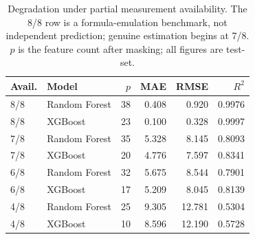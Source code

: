 \begin{table}[!t]
    \centering
    \caption{Degradation under partial measurement availability. The 8/8 row is a formula-emulation benchmark, not independent prediction; genuine estimation begins at 7/8. $p$ is the feature count after masking; all figures are test-set.}
    \label{tab:partial}
    \small
    \setlength{\tabcolsep}{4pt}
    \begin{tabular}{llrrrr}
        \toprule
        Avail. & Model & $p$ & MAE & RMSE & $R^2$ \\
        \midrule
        8/8 & Random Forest & 38 & 0.408 & 0.920 & 0.9976 \\
        8/8 & XGBoost & 23 & 0.100 & 0.328 & 0.9997 \\
        7/8 & Random Forest & 35 & 5.328 & 8.145 & 0.8093 \\
        7/8 & XGBoost & 20 & 4.776 & 7.597 & 0.8341 \\
        6/8 & Random Forest & 32 & 5.675 & 8.544 & 0.7901 \\
        6/8 & XGBoost & 17 & 5.209 & 8.045 & 0.8139 \\
        4/8 & Random Forest & 25 & 9.305 & 12.781 & 0.5304 \\
        4/8 & XGBoost & 10 & 8.596 & 12.190 & 0.5728 \\
        \bottomrule
    \end{tabular}
\end{table}
